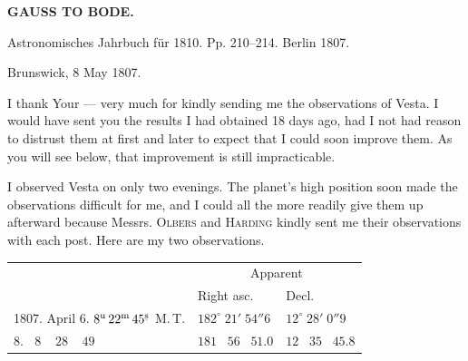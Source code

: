 \clearpage
{}
%
\begin{center}
\textbf{GAUSS TO BODE.}

\hrulefill

Astronomisches Jahrbuch für 1810. Pp. 210–214. Berlin 1807.

\hrulefill
\end{center}

\begin{flushright}
Brunswick, 8 May 1807.
\end{flushright}

\par\indent I thank Your --- very much for kindly sending me the observations of Vesta. I would have sent you the results I had obtained 18 days ago, had I not had reason to distrust them at first and later to expect that I could soon improve them. As you will see below, that improvement is still impracticable.

\par\indent I observed Vesta on only two evenings. The planet’s high position soon made the observations difficult for me, and I could all the more readily give them up afterward because Messrs. \textsc{Olbers} and \textsc{Harding} kindly sent me their observations with each post. Here are my two observations.

\begin{center}\begingroup
\fontsize{9}{11}\selectfont
\setlength{\tabcolsep}{3pt}\renewcommand{\arraystretch}{1.15}
\begin{tabular}{l|l|l}
& \multicolumn{2}{c}{Apparent} \\
& Right asc. \VestaAltarRA{} & Decl. \VestaAltarDecl{} \\
\hline
1807. April 6. $8^{\mathrm u}\,22^{\mathrm m}\,45^{\rlap{\raisebox{-.32ex}{\hspace{.10em}\rule{.12em}{.28pt}}}\mathrm s}$ M.\,T. & $182^\circ\;21'\;54''6$ & $12^\circ\;28'\;0''9$ \\
\phantom{1807. April} 8. $\;\;8\;\;\;\;28\;\;\;\;49$ & $181\;\;\;56\;\;\;51.0$ & $12\;\;\;35\;\;\;45.8$ \\
\end{tabular}\endgroup\end{center}

